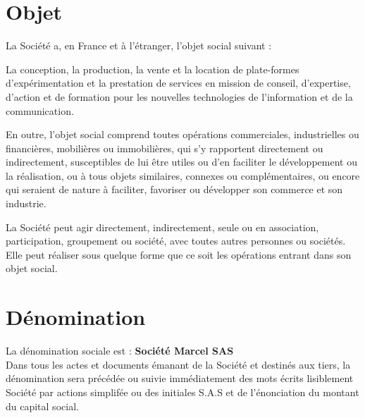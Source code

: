 \documentclass[a4paper,12pt]{report}
\begin{document}
\section{Objet}
La Société a, en France et à l'étranger, l'objet social suivant :

La conception, la production, la vente et la location de plate-formes d'expérimentation et la prestation de services en mission de conseil, d'expertise, d'action et de formation pour les nouvelles technologies de l'information et de la communication.

En outre, l'objet social comprend toutes opérations commerciales, industrielles ou financières, mobilières ou immobilières, qui s'y rapportent directement ou indirectement, susceptibles de lui être utiles ou d'en faciliter le développement ou la réalisation, ou à tous objets similaires, connexes ou complémentaires, ou encore qui seraient de nature à faciliter, favoriser ou développer son commerce et son industrie.

La Société peut agir directement, indirectement, seule ou en association, participation, groupement ou société, avec toutes autres personnes ou sociétés. Elle peut réaliser sous quelque forme que ce soit les opérations entrant dans son objet social.

\section{Dénomination}
La dénomination sociale est : \og \textbf{Société Marcel SAS} \fg{}\\
Dans tous les actes et documents émanant de la Société et destinés aux tiers, 
la dénomination sera précédée ou suivie immédiatement des mots écrits lisiblement \og Société par actions simplifée \fg{} 
ou des initiales \og S.A.S \fg{} et de l'énonciation du montant du capital social.
\end{document}

